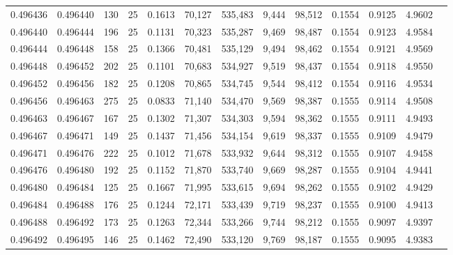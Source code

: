 \begin{tabular}{rrrrrrrrrrrrr}
0.496436 & 0.496440 & 130 &  25 &                                     0.1613 &  70,127 & 535,483 &   9,444 &  98,512 & 0.1554 & 0.9125 & 4.9602 \\
0.496440 & 0.496444 & 196 &  25 &                                     0.1131 &  70,323 & 535,287 &   9,469 &  98,487 & 0.1554 & 0.9123 & 4.9584 \\
0.496444 & 0.496448 & 158 &  25 &                                     0.1366 &  70,481 & 535,129 &   9,494 &  98,462 & 0.1554 & 0.9121 & 4.9569 \\
0.496448 & 0.496452 & 202 &  25 &                                     0.1101 &  70,683 & 534,927 &   9,519 &  98,437 & 0.1554 & 0.9118 & 4.9550 \\
0.496452 & 0.496456 & 182 &  25 &                                     0.1208 &  70,865 & 534,745 &   9,544 &  98,412 & 0.1554 & 0.9116 & 4.9534 \\
0.496456 & 0.496463 & 275 &  25 &                                     0.0833 &  71,140 & 534,470 &   9,569 &  98,387 & 0.1555 & 0.9114 & 4.9508 \\
0.496463 & 0.496467 & 167 &  25 &                                     0.1302 &  71,307 & 534,303 &   9,594 &  98,362 & 0.1555 & 0.9111 & 4.9493 \\
0.496467 & 0.496471 & 149 &  25 &                                     0.1437 &  71,456 & 534,154 &   9,619 &  98,337 & 0.1555 & 0.9109 & 4.9479 \\
0.496471 & 0.496476 & 222 &  25 &                                     0.1012 &  71,678 & 533,932 &   9,644 &  98,312 & 0.1555 & 0.9107 & 4.9458 \\
0.496476 & 0.496480 & 192 &  25 &                                     0.1152 &  71,870 & 533,740 &   9,669 &  98,287 & 0.1555 & 0.9104 & 4.9441 \\
0.496480 & 0.496484 & 125 &  25 &                                     0.1667 &  71,995 & 533,615 &   9,694 &  98,262 & 0.1555 & 0.9102 & 4.9429 \\
0.496484 & 0.496488 & 176 &  25 &                                     0.1244 &  72,171 & 533,439 &   9,719 &  98,237 & 0.1555 & 0.9100 & 4.9413 \\
0.496488 & 0.496492 & 173 &  25 &                                     0.1263 &  72,344 & 533,266 &   9,744 &  98,212 & 0.1555 & 0.9097 & 4.9397 \\
0.496492 & 0.496495 & 146 &  25 &                                     0.1462 &  72,490 & 533,120 &   9,769 &  98,187 & 0.1555 & 0.9095 & 4.9383 \\

\end{tabular}
